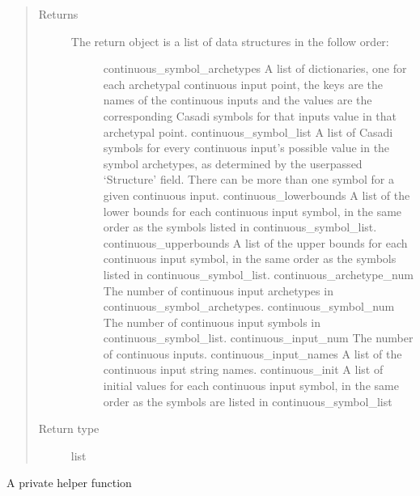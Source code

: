 \documentclass[letterpaper,10pt,english,openany,oneside]{sphinxmanual}
\begin{document}
\begin{fulllineitems}
\begin{fulllineitems}
\begin{quote}
\begin{description}
\begin{itemize}
\end{itemize}

\item[{Returns}] \leavevmode
\begin{description}
\item[{The return object is a list of data structures in the follow order:}] \leavevmode
continuous\_symbol\_archetypes \textendash{} A list of dictionaries, one for each archetypal
continuous input point, the keys are the names of the continuous inputs and the
values are the corresponding Casadi symbols for that inputs value in that archetypal
point.
continuous\_symbol\_list \textendash{} A list of Casadi symbols for every continuous input’s possible
value in the symbol archetypes, as determined by the user\sphinxhyphen{}passed ‘Structure’ field.
There can be more than one symbol for a given continuous input.
continuous\_lowerbounds \textendash{} A list of the lower bounds for each continuous input symbol,
in the same order as the symbols listed in continuous\_symbol\_list.
continuous\_upperbounds \textendash{} A list of the upper bounds for each continuous input symbol,
in the same order as the symbols listed in continuous\_symbol\_list.
continuous\_archetype\_num \textendash{} The number of continuous input archetypes in continuous\_symbol\_archetypes.
continuous\_symbol\_num \textendash{} The number of continuous input symbols in continuous\_symbol\_list.
continuous\_input\_num \textendash{} The number of continuous inputs.
continuous\_input\_names \textendash{} A list of the continuous input string names.
continuous\_init \textendash{} A list of initial values for each continuous input symbol, in the
same order as the symbols are listed in continuous\_symbol\_list

\end{description}


\item[{Return type}] \leavevmode
list

\end{description}\end{quote}

\end{fulllineitems}


\begin{fulllineitems}
\label{\detokenize{nloed:nloed.design.Design.__optim_settup}}
A private helper function


\end{fulllineitems}
\end{fulllineitems}
\end{document}
